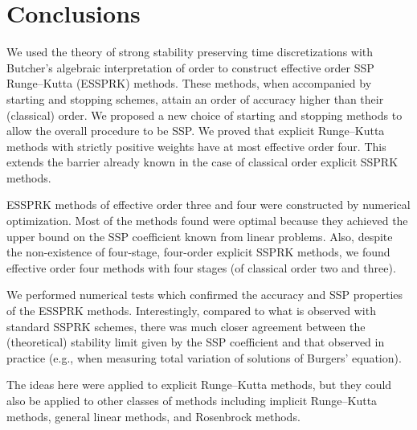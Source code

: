 \section{Conclusions}\label{sec:Conclusion}
We used the theory of strong stability preserving time discretizations
with Butcher's algebraic interpretation of order to construct
effective order SSP Runge--Kutta (ESSPRK) methods. 
These methods, when accompanied by starting and stopping
schemes, attain an order of accuracy higher than their (classical) order.
We proposed a new choice of starting and stopping methods to allow the
overall procedure to be SSP.
We proved that explicit Runge--Kutta methods with strictly positive 
weights have at most effective order four. 
This extends the barrier already known in the case of classical order
explicit SSPRK methods.

ESSPRK methods of effective order three and four
were constructed by numerical optimization.
Most of the methods found were optimal because they achieved
the upper bound on the SSP coefficient known from linear
problems.
Also, despite the non-existence of four-stage, four-order explicit SSPRK methods, 
we found effective order four methods with four stages (of classical 
order two and three). 


We performed numerical tests which confirmed the accuracy and
SSP properties of the ESSPRK methods.
Interestingly, compared to what is observed with standard SSPRK schemes,
there was much closer agreement between the (theoretical) stability limit
given by the SSP coefficient and that observed in practice
(e.g., when measuring total variation of solutions of Burgers' equation).

The ideas here were applied to explicit Runge--Kutta methods, but they
could also be applied to other classes of methods including implicit
Runge--Kutta methods, general linear methods, and Rosenbrock methods.
